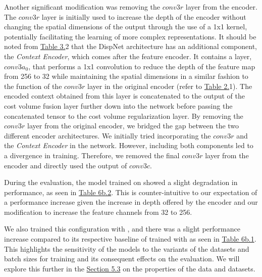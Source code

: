 \begin{enumerate}
    Another significant modification was removing the $conv3r$ layer from the {\mvsn} encoder. The $conv3r$ layer is initially used to increase the depth of the encoder without changing the spatial dimensions of the output through the use of a 1x1 kernel, potentially facilitating the learning of more complex representations.  It should be noted from \hyperref[tab:arch-rmvd]{Table 3.}{2} that the DispNet architecture has an additional component, the \textit{Context Encoder}, which comes after the feature encoder. It contains a layer, $conv3a_0$, that performs a 1x1 convolution to reduce the depth of the feature map from 256 to 32 while maintaining the spatial dimensions in a similar fashion to the function of the $conv3r$ layer in the original {\mvsn} encoder (refer to \hyperref[tab:arch-mvsn]{Table 2.}{1}). The encoded context obtained from this layer is concatenated to the output of the cost volume fusion layer further down into the network before passing the concatenated tensor to the cost volume regularization layer. By removing the $conv3r$ layer from the original {\mvsn} encoder, we bridged the gap between the two different encoder architectures. We initially tried incorporating the $conv3r$ and the \textit{Context Encoder} in the network. However, including both components led to a divergence in training. Therefore, we removed the final $conv3r$ layer from the {\mvsn} encoder and directly used the output of $conv3c$. \par
    
    During the evaluation, the model trained on {\bms} showed a slight degradation in performance, as seen in \hyperref[tab:feat-enc]{Table 6b.2}. This is counter-intuitive to our expectation of a performance increase given the increase in depth offered by the {\mvsn} encoder and our modification to increase the feature channels from 32 to 256.\par
    We also trained this configuration with {\brs}, and there was a slight performance increase compared to its respective baseline of {\rmvd} trained with {\brs} as seen in \hyperref[tab:feat-enc]{Table 6b.1}. This highlights the sensitivity of the models to the variants of the datasets and batch sizes for training and its consequent effects on the evaluation. We will explore this further in the \hyperref[sec:exp-dataset-prop]{Section 5.3} on the properties of the data and datasets. 


\end{enumerate}

